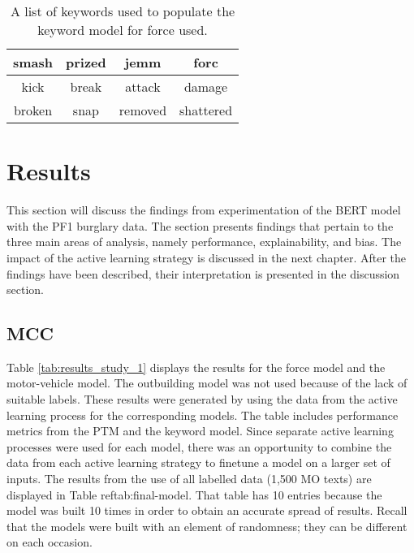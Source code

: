 \begin{table}[]
\begin{tabular}{|c|c|c|c|}
\hline
smash  & prized & jemm    & forc      \\ \hline
kick   & break  & attack  & damage    \\ \hline
broken & snap   & removed & shattered \\ \hline
\end{tabular}
\caption[Keywords for keyword model - force used]{\label{tab:Keywords_force} A list of keywords used to populate the keyword model for force used.}
\end{table}


\section{Results} This section will discuss the findings from experimentation of the BERT model with the PF1 burglary data. The section presents findings that pertain to the three main areas of analysis, namely performance, explainability, and bias. The impact of the active learning strategy is discussed in the next chapter. After the findings have been described, their interpretation is presented in the discussion section.


\subsection{MCC} Table \ref{tab:results_study_1} displays the results for the force model and the motor-vehicle model. The outbuilding model was not used because of the lack of suitable labels. These results were generated by using the data from the active learning process for the corresponding models. The table includes performance metrics from the PTM and the keyword model. Since separate active learning processes were used for each model, there was an opportunity to combine the data from each active learning strategy to finetune a model on a larger set of inputs. The results from the use of all labelled data (1,500 MO texts) are displayed in Table ref{tab:final-model}. That table has 10 entries because the model was built 10 times in order to obtain an accurate spread of results. Recall that the models were built with an element of randomness; they can be different on each occasion. 

